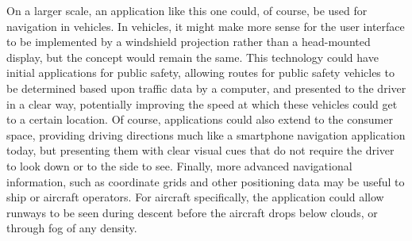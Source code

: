 \documentclass[11pt]{article}
\begin{document}
On a larger scale, an application like this one could, of course, be used for navigation
in vehicles. In vehicles, it might make more sense for the user interface to be
implemented by a windshield projection rather than a head-mounted display, but the concept
would remain the same. This technology could have initial applications for public safety,
allowing routes for public safety vehicles to be determined based upon traffic data by a
computer, and presented to the driver in a clear way, potentially improving the speed at
which these vehicles could get to a certain location. Of course, applications could also
extend to the consumer space, providing driving directions much like a smartphone
navigation application today, but presenting them with clear visual cues that do not
require the driver to look down or to the side to see. Finally, more advanced navigational
information, such as coordinate grids and other positioning data may be useful to ship or
aircraft operators. For aircraft specifically, the application could allow runways to be
seen during descent before the aircraft drops below clouds, or through fog of any density.
\end{document}
